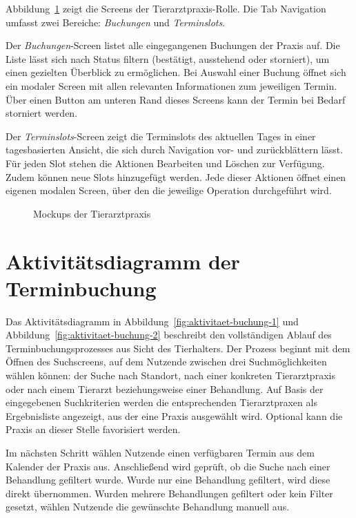 Abbildung~\ref{fig:mockup-tierarzt} zeigt die Screens der Tierarztpraxis-Rolle. Die Tab Navigation umfasst zwei Bereiche: 
\textit{Buchungen} und \textit{Terminslots}.

Der \textit{Buchungen}-Screen listet alle eingegangenen Buchungen der Praxis auf. Die Liste lässt sich nach Status filtern (bestätigt, ausstehend oder storniert), um einen gezielten Überblick zu ermöglichen. Bei Auswahl einer Buchung öffnet sich ein modaler Screen mit allen relevanten Informationen zum jeweiligen 
Termin. Über einen Button am unteren Rand dieses Screens kann der Termin bei Bedarf storniert werden.

Der \textit{Terminslots}-Screen zeigt die Terminslots des aktuellen Tages in einer tagesbasierten Ansicht, die sich durch Navigation 
vor- und zurückblättern lässt. Für jeden Slot stehen die Aktionen Bearbeiten und Löschen zur Verfügung. Zudem können neue Slots hinzugefügt werden. Jede dieser Aktionen öffnet einen eigenen 
modalen Screen, über den die jeweilige Operation durchgeführt wird.

\begin{figure}[H]
    \centering
    
    \caption{Mockups der Tierarztpraxis}
    \label{fig:mockup-tierarzt}
\end{figure}
\clearpage

\section{Aktivitätsdiagramm der Terminbuchung}

Das Aktivitätsdiagramm in Abbildung~\ref{fig:aktivitaet-buchung-1} und Abbildung~\ref{fig:aktivitaet-buchung-2} 
beschreibt den vollständigen Ablauf des Terminbuchungsprozesses aus Sicht des Tierhalters. Der Prozess beginnt mit dem Öffnen des Suchscreens, auf dem Nutzende zwischen drei Suchmöglichkeiten
wählen können: der Suche nach Standort, nach einer konkreten Tierarztpraxis oder nach einem Tierarzt beziehungsweise einer Behandlung. Auf Basis der eingegebenen Suchkriterien werden die entsprechenden Tierarztpraxen als Ergebnisliste angezeigt, aus der eine Praxis ausgewählt wird. Optional kann die Praxis an dieser Stelle favorisiert werden.

Im nächsten Schritt wählen Nutzende einen verfügbaren Termin aus dem Kalender der Praxis aus. Anschließend wird geprüft, ob die Suche nach einer Behandlung gefiltert wurde. Wurde nur eine
Behandlung gefiltert, wird diese direkt übernommen. Wurden mehrere Behandlungen gefiltert oder kein Filter gesetzt, wählen Nutzende die gewünschte Behandlung manuell aus.

